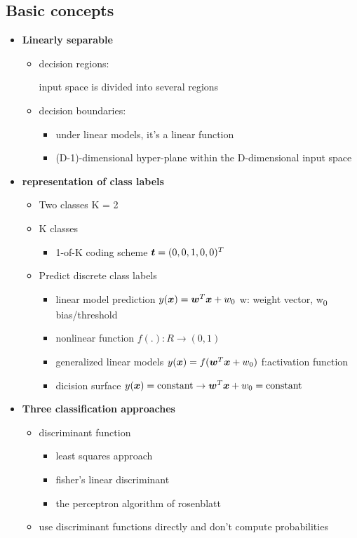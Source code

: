 \documentclass[11pt]{article}
\begin{document}
\subsection{Basic concepts}
\label{sec:orgde9d247}
\begin{itemize}
\item \textbf{Linearly separable}
\begin{itemize}
\item decision regions:

input space is divided into several regions
\item decision boundaries:
\begin{itemize}
\item under linear models, it's a linear function
\item (D-1)-dimensional hyper-plane within the D-dimensional input space
\end{itemize}
\end{itemize}
\item \textbf{representation of class labels}
\begin{itemize}
\item Two classes K = 2
\item K classes
\begin{itemize}
\item 1-of-K coding scheme \(\boldsymbol{t}=(0,0,1,0,0)^T\)
\end{itemize}
\item Predict discrete class labels
\begin{itemize}
\item linear model prediction \(y(\boldsymbol{x})=\boldsymbol{w}^T\boldsymbol{x}+w_0\)
w: weight vector, w\textsubscript{0} bias/threshold
\item nonlinear function \(f(.):R\to(0,1)\)
\item generalized linear models
\(y(\boldsymbol{x})=f(\boldsymbol{w}^T\boldsymbol{x}+w_0)\)
f:activation function
\item dicision surface
\(y(\boldsymbol{x})=\text{constant}\to \boldsymbol{w}^T\boldsymbol{x}+w_0=\text{constant}\)
\end{itemize}
\end{itemize}
\item \textbf{Three classification approaches}
\begin{itemize}
\item discriminant function
\begin{itemize}
\item least squares approach
\item fisher's linear discriminant
\item the perceptron algorithm of rosenblatt
\end{itemize}
\item use discriminant functions directly and don't compute probabilities


\end{itemize}
\end{itemize}
\end{document}
